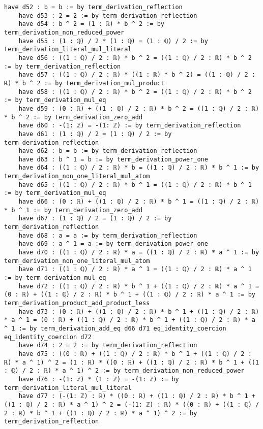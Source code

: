 \documentclass{article}
\begin{document}
\begin{tcolorbox}[colback=white!10, width=\linewidth]
\begin{lstlisting}[language=Lean4]
    have d52 : b = b := by term_derivation_reflection
    have d53 : 2 = 2 := by term_derivation_reflection
    have d54 : b ^ 2 = (1 : ℝ) * b ^ 2 := by term_derivation_non_reduced_power
    have d55 : (1 : ℚ) / 2 * (1 : ℚ) = (1 : ℚ) / 2 := by term_derivation_literal_mul_literal
    have d56 : ((1 : ℚ) / 2 : ℝ) * b ^ 2 = ((1 : ℚ) / 2 : ℝ) * b ^ 2 := by term_derivation_reflection
    have d57 : ((1 : ℚ) / 2 : ℝ) * ((1 : ℝ) * b ^ 2) = ((1 : ℚ) / 2 : ℝ) * b ^ 2 := by term_derivation_mul_product
    have d58 : ((1 : ℚ) / 2 : ℝ) * b ^ 2 = ((1 : ℚ) / 2 : ℝ) * b ^ 2 := by term_derivation_mul_eq
    have d59 : (0 : ℝ) + ((1 : ℚ) / 2 : ℝ) * b ^ 2 = ((1 : ℚ) / 2 : ℝ) * b ^ 2 := by term_derivation_zero_add
    have d60 : -(1: ℤ) = -(1: ℤ) := by term_derivation_reflection
    have d61 : (1 : ℚ) / 2 = (1 : ℚ) / 2 := by term_derivation_reflection
    have d62 : b = b := by term_derivation_reflection
    have d63 : b ^ 1 = b := by term_derivation_power_one
    have d64 : ((1 : ℚ) / 2 : ℝ) * b = ((1 : ℚ) / 2 : ℝ) * b ^ 1 := by term_derivation_non_one_literal_mul_atom
    have d65 : ((1 : ℚ) / 2 : ℝ) * b ^ 1 = ((1 : ℚ) / 2 : ℝ) * b ^ 1 := by term_derivation_mul_eq
    have d66 : (0 : ℝ) + ((1 : ℚ) / 2 : ℝ) * b ^ 1 = ((1 : ℚ) / 2 : ℝ) * b ^ 1 := by term_derivation_zero_add
    have d67 : (1 : ℚ) / 2 = (1 : ℚ) / 2 := by term_derivation_reflection
    have d68 : a = a := by term_derivation_reflection
    have d69 : a ^ 1 = a := by term_derivation_power_one
    have d70 : ((1 : ℚ) / 2 : ℝ) * a = ((1 : ℚ) / 2 : ℝ) * a ^ 1 := by term_derivation_non_one_literal_mul_atom
    have d71 : ((1 : ℚ) / 2 : ℝ) * a ^ 1 = ((1 : ℚ) / 2 : ℝ) * a ^ 1 := by term_derivation_mul_eq
    have d72 : ((1 : ℚ) / 2 : ℝ) * b ^ 1 + ((1 : ℚ) / 2 : ℝ) * a ^ 1 = (0 : ℝ) + ((1 : ℚ) / 2 : ℝ) * b ^ 1 + ((1 : ℚ) / 2 : ℝ) * a ^ 1 := by term_derivation_product_add_product_less
    have d73 : (0 : ℝ) + ((1 : ℚ) / 2 : ℝ) * b ^ 1 + ((1 : ℚ) / 2 : ℝ) * a ^ 1 = (0 : ℝ) + ((1 : ℚ) / 2 : ℝ) * b ^ 1 + ((1 : ℚ) / 2 : ℝ) * a ^ 1 := by term_derivation_add_eq d66 d71 eq_identity_coercion eq_identity_coercion d72
    have d74 : 2 = 2 := by term_derivation_reflection
    have d75 : ((0 : ℝ) + ((1 : ℚ) / 2 : ℝ) * b ^ 1 + ((1 : ℚ) / 2 : ℝ) * a ^ 1) ^ 2 = (1 : ℝ) * ((0 : ℝ) + ((1 : ℚ) / 2 : ℝ) * b ^ 1 + ((1 : ℚ) / 2 : ℝ) * a ^ 1) ^ 2 := by term_derivation_non_reduced_power
    have d76 : -(1: ℤ) * (1 : ℤ) = -(1: ℤ) := by term_derivation_literal_mul_literal
    have d77 : (-(1: ℤ) : ℝ) * ((0 : ℝ) + ((1 : ℚ) / 2 : ℝ) * b ^ 1 + ((1 : ℚ) / 2 : ℝ) * a ^ 1) ^ 2 = (-(1: ℤ) : ℝ) * ((0 : ℝ) + ((1 : ℚ) / 2 : ℝ) * b ^ 1 + ((1 : ℚ) / 2 : ℝ) * a ^ 1) ^ 2 := by term_derivation_reflection

\end{lstlisting}
\end{tcolorbox}
\end{document}
